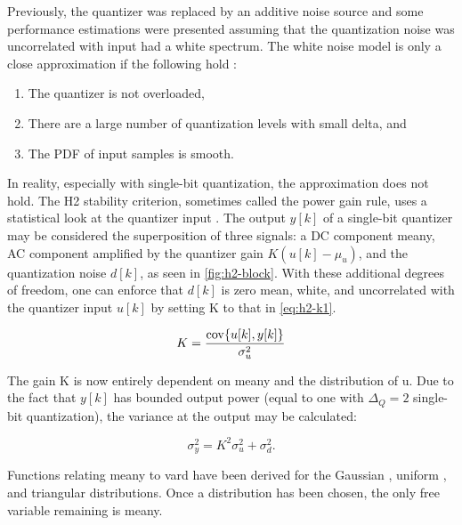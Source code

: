  Previously, the quantizer was replaced by an additive noise source and some performance estimations were presented assuming that the quantization noise was uncorrelated with input had a white spectrum. The white noise model is only a close approximation if the following hold \cite[Ch. 6]{Gray1990}:
 
 \begin{enumerate}
 	\item The quantizer is not overloaded,
 	\item There are a large number of quantization levels with small \gls{delta}, and
 	\item The \gls{PDF} of input samples is smooth.
 \end{enumerate}
 
 In reality, especially with single-bit quantization, the approximation does not hold. The \gls{H2} stability criterion, sometimes called the power gain rule, uses a statistical look at the quantizer input \cite{Risbo1994}. The output $y[k]$ of a single-bit quantizer may be considered the superposition of three signals: a DC component \gls{meany}, AC component amplified by the quantizer gain $K\left(u[k] - \mu_u\right)$, and the quantization noise $d[k]$, as seen in \autoref{fig:h2-block}. With these additional degrees of freedom, one can enforce that $d[k]$ is zero mean, white, and uncorrelated with the quantizer input $u[k]$ by setting \gls{K} to that in \autoref{eq:h2-k1}.
 
 \begin{equation}
 	K = \frac{\operatorname{cov}\{u[k], y[k]\}}{\sigma_u^2} \label{eq:h2-k1} \\
 \end{equation}
 
 The gain \gls{K} is now entirely dependent on \gls{meany} and the distribution of \gls{u}. Due to the fact that $y[k]$ has bounded output power (equal to one with $\Delta_Q=2$ single-bit quantization), the variance at the output may be calculated:
 
 \begin{equation}
 	\sigma_y^2 = K^2\sigma_u^2 + \sigma_d^2.
 \end{equation} 
 
Functions relating \gls{meany} to \gls{vard} have been derived for the Gaussian \cite[Eq. 26]{Ardalan1987}, uniform \cite[Eq. 6.16]{Risbo1994}, and triangular \cite[Eq. 6.17]{Risbo1994} distributions. Once a distribution has been chosen, the only free variable remaining is \gls{meany}. 

